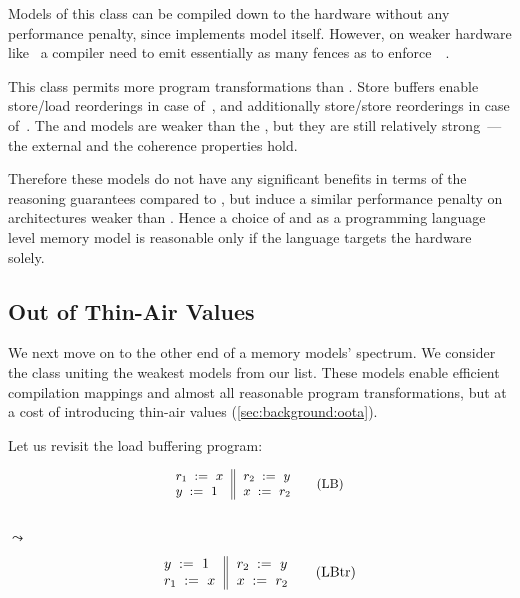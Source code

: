 Models of this class can be compiled down to the \Intel hardware without any 
performance penalty, since \Intel implements \TSO model itself.
However, on weaker hardware like~\POWER 
a compiler need to emit essentially as many fences 
as to enforce~\SC~\cite{Lustig-al:AISCA15}. 

This class permits more program transformations than \SC.
Store buffers enable store/load reorderings in case of~\TSO,
and additionally store/store reorderings in case of~\PSO.
The \TSO and \PSO models are weaker than the \SC, 
but they are still relatively strong~---
the external \DRF and the coherence properties hold.

Therefore these models do not have any significant 
benefits in terms of the reasoning guarantees compared to \SC,
but induce a similar performance penalty 
on architectures weaker than \Intel. 
Hence a choice of \TSO and \PSO as a programming language level
memory model is reasonable only if the language targets
the \Intel hardware solely. 

\subsection{Out of Thin-Air Values}
\label{sec:analysis:oota}

We next move on to the other end of a memory models' spectrum. 
We consider the class uniting the weakest models from our list.
These models enable efficient compilation mappings and 
almost all reasonable program transformations, but at a cost of 
introducing thin-air values (\cref{sec:background:oota}).

Let us revisit the load buffering program:  

\begin{minipage}{0.43\linewidth}
\begin{equation*}
\small
\inarrII{
  \readInst{}{r_1}{x}     \\
  \writeInst{}{y}{1}      \\
}{
  \readInst{}{r_2}{y}     \\
  \writeInst{}{x}{r_2}    \\
}
\tag{LB}\label{ex:lbA}
\end{equation*}
\end{minipage}\hfill%
\begin{minipage}{0.09\linewidth}
\Large~\\ $\leadsto$
\end{minipage}\hfill%
\begin{minipage}{0.43\linewidth}
\begin{equation*}
\inarrII{
  \writeInst{}{y}{1}      \\
  \readInst{}{r_1}{x}     \\
}{
  \readInst{}{r_2}{y}     \\
  \writeInst{}{x}{r_2}    \\
}
\tag{LBtr}\label{ex:lbB}
\end{equation*}
\end{minipage}

